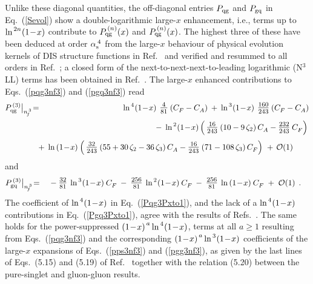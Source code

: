 \documentclass[12pt]{article}
\newcommand{\hspn}{{\hspace{-4mm}}}
\newcommand{\bea}{\begin{eqnarray}}
\newcommand{\eea}{\end{eqnarray}}
\newcommand{\nn}{\nonumber}
\begin{document}
Unlike these diagonal quantities, the off-diagonal entries $P_{\rm qg}$
and $P_{\rm gq}$ in Eq.~(\ref{Sevol}) show a double-logarithmic large-$x$
enhancement, i.e., terms up to $\ln^{\,2 n\!}\x1$ contribute to 
$P_{\rm qg}^{\,(n)}(x)$ and $P_{\rm qg}^{\,(n)}(x)$. The highest three of
these have been deduced at order $\as(4)$ from the large-$x$ behaviour of
physical evolution kernels of DIS structure functions in Ref.~\cite{SMVV09} 
and verified and resummed to all orders in Ref.~\cite{ASV10}; a closed form 
of the next-to-next-next-to-leading logarithmic (N$^3$LL) terms has been
obtained in Ref.~\cite{ALPV15}.
The large-$x$ enhanced contributions to Eqs.~(\ref{pqg3nf3}) and 
(\ref{pgq3nf3}) read
%
\bea
    P_{\rm qg}^{\,(3)}\big|_{\nft} &\!=\!& \;
\label{Pqg3Pxto1}
  \ln^{\,4\!} \x1 \:\, \*  
     \frct{4}{81}\: \* ( \cf - \ca )
  \: + \: \ln^{\,3\!} \x1 \:\, \*  
       \frct{160}{243}\: \* ( \cf - \ca )
\nn \\[0.5mm] & & \mbox{\hspn}
  - \: \ln^{\,2\!} \x1 \, \*  \Big(\,
       \frct{16}{243}\: \* ( 10 - 9\,\* \z2 )\, \* \ca 
     - \frct{232}{243}\: \* \cf
       \Big)\,
\\[1mm] & & \mbox{\hspn}
  + \: \ln \x1 \: \*  \Big(\,
       \frct{32}{243}\: \* ( 55 + 30\,\* \z2 - 36\,\* \z3 )\, \* \ca
      - \frct{16}{243}\: \* (71 - 108\,\* \z3)\,\* \cf
       \Big)\,
  \, + \, {\cal O}(1) \qquad
\nn
\eea
%
and
%
\bea
    P_{\rm gq}^{\,(3)}\big|_{\nft} &\!=\!& \;
\label{Pgq3Pxto1} 
 \: - \: \frct{32}{81} \: \* \ln^{\,3\!} \x1 \: \* \cf   
 \: - \: \frct{256}{81} \: \* \ln^{\,2\!} \x1 \: \* \cf
 \: - \: \frct{256}{81} \: \* \ln \x1 \: \* \cf
 \; + \; {\cal O}(1)
\:\: . \quad 
\eea
%
The coefficient of $\ln^{\,4\!} \x1$ in Eq.~(\ref{Pqg3Pxto1}), and the
lack of a $\ln^{\,4\!} \x1$ contributions in Eq.~(\ref{Pgq3Pxto1}), 
agree with the results of Refs.~\cite{SMVV09}. 
The same holds for the power-suppressed $\x1^{\,a} \ln^{\,4\!} \x1$,
terms at all $a \geq 1$ resulting from Eqs.~(\ref{pqg3nf3}) and the 
corresponding $\x1^{\,a} \ln^{\,3\!} \x1$ coefficients of the large-$x$ 
expansions of Eqs.~(\ref{pps3nf3}) and (\ref{pgg3nf3}), as given by the
last lines of Eqs.~(5.15) and (5.19) of Ref.~\cite{SMVV09} together with
the relation (5.20) between the pure-singlet and gluon-gluon results.
\end{document}
